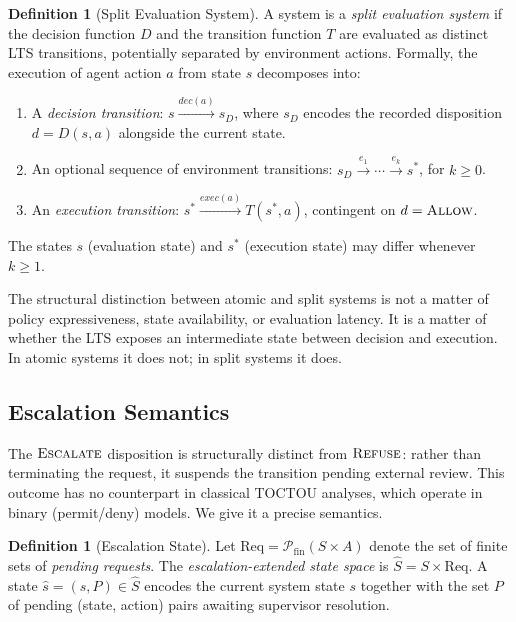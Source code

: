 \documentclass[11pt]{article}
\theoremstyle{plain}
\theoremstyle{definition}
\newtheorem{definition}[theorem]{Definition}
\theoremstyle{remark}
\newcommand{\Allow}{\textsc{Allow}}
\newcommand{\Refuse}{\textsc{Refuse}}
\newcommand{\Escalate}{\textsc{Escalate}}
\newcommand{\Req}{\mathrm{Req}}
\begin{document}
\begin{definition}[Split Evaluation System]
\label{def:split}
A system is a \emph{split evaluation system} if the decision function $D$ and
the transition function $T$ are evaluated as distinct LTS transitions,
potentially separated by environment actions.  Formally, the execution of
agent action $a$ from state $s$ decomposes into:
\begin{enumerate}[label=(\arabic*)]
  \item A \emph{decision transition}: $s \xrightarrow{\mathit{dec}(a)} s_D$,
    where $s_D$ encodes the recorded disposition $d = D(s, a)$ alongside the
    current state.
  \item An optional sequence of environment transitions:
    $s_D \xrightarrow{e_1} \cdots \xrightarrow{e_k} s^*$, for $k \geq 0$.
  \item An \emph{execution transition}: $s^* \xrightarrow{\mathit{exec}(a)}
    T(s^*, a)$, contingent on $d = \Allow$.
\end{enumerate}
The states $s$ (evaluation state) and $s^*$ (execution state) may differ
whenever $k \geq 1$.
\end{definition}

The structural distinction between atomic and split systems is not a matter of
policy expressiveness, state availability, or evaluation latency.  It is a
matter of whether the LTS exposes an intermediate state between decision and
execution.  In atomic systems it does not; in split systems it does.

\subsection{Escalation Semantics}
\label{sec:escalate}

The $\Escalate$ disposition is structurally distinct from $\Refuse$: rather
than terminating the request, it suspends the transition pending external
review.  This outcome has no counterpart in classical TOCTOU analyses, which
operate in binary (permit/deny) models.  We give it a precise semantics.

\begin{definition}[Escalation State]
\label{def:escstate}
Let $\Req = \mathcal{P}_{\mathrm{fin}}(S \times A)$ denote the set of finite
sets of \emph{pending requests}.  The \emph{escalation-extended state space}
is $\hat{S} = S \times \Req$.  A state $\hat{s} = (s, P) \in \hat{S}$
encodes the current system state $s$ together with the set $P$ of pending
(state, action) pairs awaiting supervisor resolution.
\end{definition}
\end{document}
